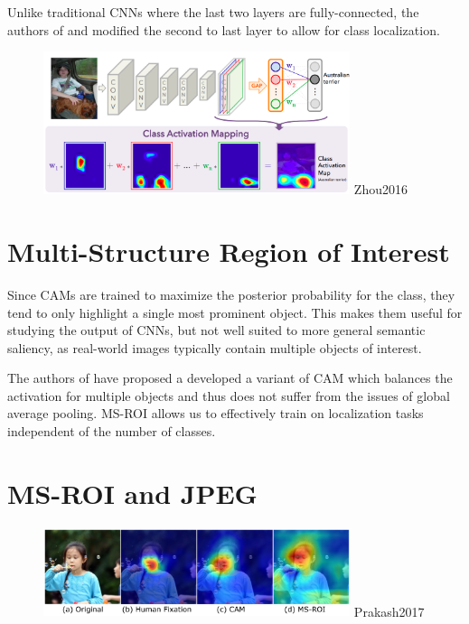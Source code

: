 Unlike traditional CNNs where the last two layers are fully-connected, the authors of \cite{Oquab2015} and \cite{Zhou2016} modified the second to last layer to allow for class localization.

\begin{figure}[!ht]
    \centering
    \includegraphics[width=0.80\textwidth]{fig/4-3.png}
    {Zhou2016 \cite{Zhou2016}}
    \label{fig:LeNet}
\end{figure}

\section{Multi-Structure Region of Interest}

Since CAMs are trained to maximize the posterior probability for the class, they tend to only highlight a single most prominent object. This makes them useful for studying the output of CNNs, but not well suited to more general semantic saliency, as real-world images typically contain multiple objects of interest.

The authors of \cite{Prakash2017} have proposed a developed a variant of CAM which balances the activation for multiple objects and thus does not suffer from the issues of global average pooling. MS-ROI allows us to effectively train on localization tasks independent of the number of classes. 


\section{MS-ROI and JPEG}

\begin{figure}[!ht]
    \centering
    \includegraphics[width=0.80\textwidth]{fig/4-4.png}
    {Prakash2017 \cite{Prakash2017}}
    \label{fig:comparisonOfObjectDetectingMethods}
\end{figure}

